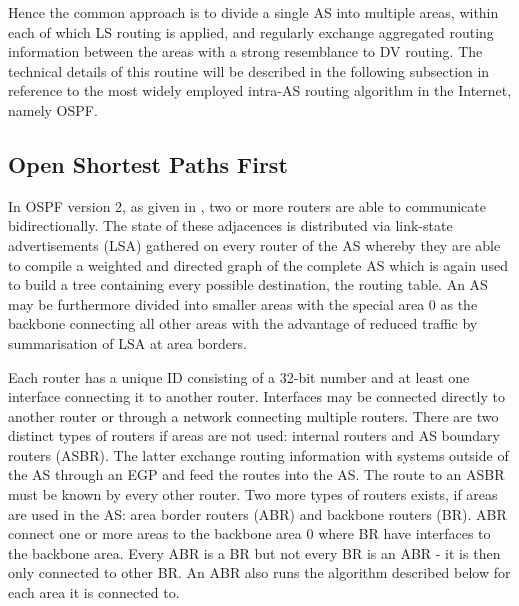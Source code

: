 \documentclass{acm_proc_article-sp}
\begin{document}
Hence the common approach is to divide a single AS into multiple areas, within each of which LS routing is applied, and regularly exchange aggregated routing information between the areas with a strong resemblance to DV routing. The technical details of this routine will be described in the following subsection in reference to the most widely employed intra-AS routing algorithm in the Internet, namely OSPF.

\subsection{Open Shortest Paths First}

In OSPF version 2, as given in \cite{RFC1247}, two or more routers are able to communicate bidirectionally. The state of these adjacences is distributed via link-state advertisements (LSA) gathered on every router of the AS whereby they are able to compile a weighted and directed graph of the complete AS which is again used to build a tree containing every possible destination, the routing table. An AS may be furthermore divided into smaller areas with the special area 0 as the backbone connecting all other areas with the advantage of reduced traffic by summarisation of LSA at area borders.

Each router has a unique ID consisting of a 32-bit number and at least one interface connecting it to another router. Interfaces may be connected directly to another router or through a network connecting multiple routers. There are two distinct types of routers if areas are not used: internal routers and AS boundary routers (ASBR). The latter exchange routing information with systems outside of the AS through an EGP and feed the routes into the AS. The route to an ASBR must be known by every other router. Two more types of routers exists, if areas are used in the AS: area border routers (ABR) and backbone routers (BR). ABR connect one or more areas to the backbone area 0 where BR have interfaces to the backbone area. Every ABR is a BR but not every BR is an ABR - it is then only connected to other BR. An ABR also runs the algorithm described below for each area it is connected to.
\end{document}
